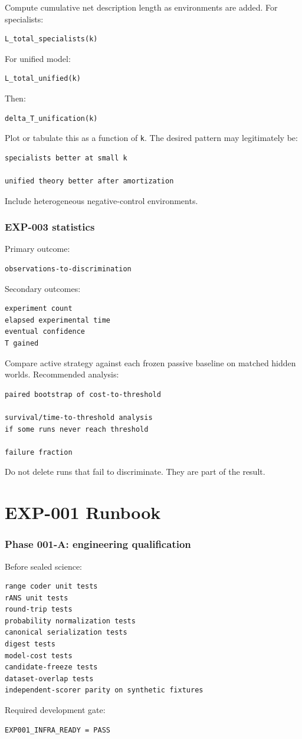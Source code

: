 \documentclass[11pt]{article}
\begin{document}
Compute cumulative net description length as environments are added. For specialists:
\begin{verbatim}
L_total_specialists(k)
\end{verbatim}
For unified model:
\begin{verbatim}
L_total_unified(k)
\end{verbatim}
Then:
\begin{verbatim}
delta_T_unification(k)
\end{verbatim}
Plot or tabulate this as a function of \texttt{k}. The desired pattern may legitimately be:
\begin{verbatim}
specialists better at small k

unified theory better after amortization
\end{verbatim}
Include heterogeneous negative-control environments.

\section{EXP-003 statistics}

Primary outcome:
\begin{verbatim}
observations-to-discrimination
\end{verbatim}
Secondary outcomes:
\begin{verbatim}
experiment count
elapsed experimental time
eventual confidence
T gained
\end{verbatim}
Compare active strategy against each frozen passive baseline on matched hidden worlds. Recommended analysis:
\begin{verbatim}
paired bootstrap of cost-to-threshold

survival/time-to-threshold analysis
if some runs never reach threshold

failure fraction
\end{verbatim}
Do not delete runs that fail to discriminate. They are part of the result.

\part{EXP-001 Runbook}

\section{Phase 001-A: engineering qualification}

Before sealed science:
\begin{verbatim}
range coder unit tests
rANS unit tests
round-trip tests
probability normalization tests
canonical serialization tests
digest tests
model-cost tests
candidate-freeze tests
dataset-overlap tests
independent-scorer parity on synthetic fixtures
\end{verbatim}
Required development gate:
\begin{verbatim}
EXP001_INFRA_READY = PASS
\end{verbatim}
\end{document}
